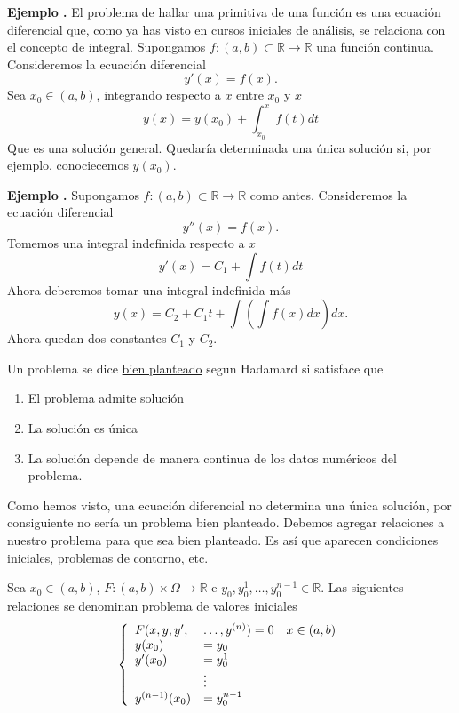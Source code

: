 \documentclass{article}
\newcommand{\rr}{\mathbb{R}}
\newcounter{ejemplo_cont}
\newenvironment{ejemplo}{\noindent\textbf{Ejemplo  \arabic{ejemplo_cont}.} }{\addtocounter{ejemplo_cont}{1}}
\begin{document}
\begin{ejemplo} El problema de hallar una primitiva de una función es una ecuación diferencial que, como ya has visto en cursos iniciales de análisis, se relaciona con el concepto de integral. Supongamos $f:(a,b)\subset \rr\to\rr$ una función continua. Consideremos la ecuación diferencial
\[y'(x)=f(x).\]
Sea $x_0\in(a,b)$, integrando respecto a $x$ entre $x_0$ y $x$
\[y(x)=y(x_0)+\int_{x_0}^xf(t)dt\]
Que es una solución general. Quedaría determinada una única solución si, por ejemplo, conociecemos $y(x_0)$.
\end{ejemplo}



\begin{ejemplo} Supongamos $f:(a,b)\subset \rr\to\rr$ como antes. Consideremos la ecuación diferencial
\[y''(x)=f(x).\]
Tomemos una integral indefinida respecto a $x$ 
\[y'(x)=C_1+\int f(t)dt\]
Ahora deberemos tomar una integral indefinida más
\[y(x)=C_2+C_1t +\int\left(\int f(x)dx\right)dx.\]
Ahora quedan dos constantes $C_1$ y $C_2$. 
\end{ejemplo}



 \begin{definicion}
 Un problema se dice \href{http://es.wikipedia.org/wiki/Problema_bien_definido}{bien planteado} segun Hadamard si satisface que
 \begin{enumerate}
  \item El problema admite solución
  \item La solución es única
  \item La solución depende de manera continua de los datos numéricos del problema.
 \end{enumerate}
\end{definicion}

 Como hemos visto, una ecuación diferencial no determina una única solución, por consiguiente no sería un problema bien planteado. Debemos agregar relaciones
a nuestro problema para que sea bien planteado. Es así que aparecen condiciones iniciales, problemas de contorno, etc.
 




\begin{definicion} Sea $x_0\in(a,b)$, $F:(a,b)\times \Omega\to\rr$ e $y_0,y_0^1,\ldots,y_0^{n-1}\in\rr$. Las siguientes relaciones  se denominan problema de
valores iniciales
\[
 \left\{\begin{array}{l l l}
         F(x,y,y',&\ldots,y^{(n)})=0& x\in(a,b)\\
         y(x_0)&=y_0&\\
         y'(x_0)&=y_0^1&\\
          & \vdots &\\
          y^{(n-1)}(x_0)&=y_0^{n-1}&\\
        \end{array}
   \right.
\]

\end{definicion}
\end{document}
